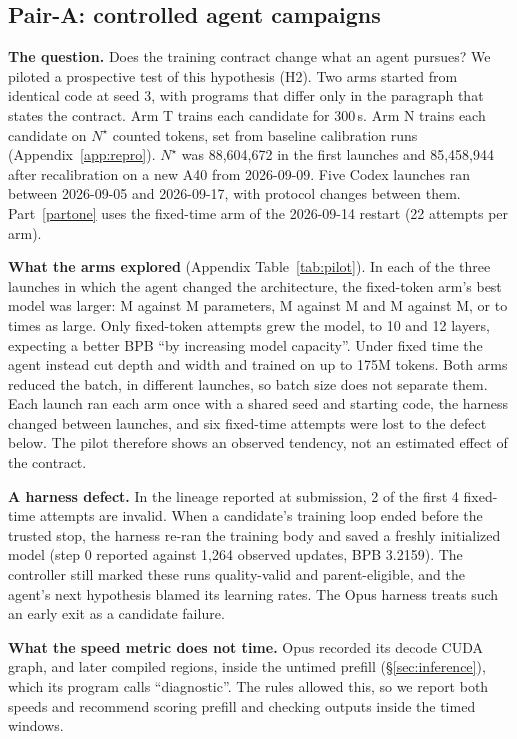 \documentclass{article}
\newif\ifshowhumanmarkers \showhumanmarkersfalse
\newcommand{\humantag}[1]{{\color{humanframe}\sffamily\scriptsize\bfseries HUMAN AUTHOR MUST REWRITE/VERIFY [#1]}\ }
\newcommand{\humanauthor}[2][]{\ifshowhumanmarkers\begin{humanbox}\humantag{#1}#2\end{humanbox}\else #2\par\fi}
\begin{document}
\subsection{Pair-A: controlled agent campaigns}\label{sec:pilot}
\humanauthor[P2-15 r6]{\textbf{The question.} Does the training contract change what an agent pursues? We piloted a prospective test of this hypothesis (H2). Two arms started from identical code at seed 3, with programs that differ only in the paragraph that states the contract. Arm T trains each candidate for 300\,s. Arm N trains each candidate on $N^\star$ counted tokens, set from baseline calibration runs (Appendix~\ref{app:repro}). $N^\star$ was 88,604,672 in the first launches and 85,458,944 after recalibration on a new A40 from 2026-09-09. Five Codex launches ran between 2026-09-05 and 2026-09-17, with protocol changes between them. Part~\ref{partone} uses the fixed-time arm of the 2026-09-14 restart (22 attempts per arm).

\textbf{What the arms explored} (Appendix Table~\ref{tab:pilot}). In each of the three launches in which the agent changed the architecture, the fixed-token arm's best model was larger: \CRFivePilotNA M against \CRFivePilotTA M parameters, \CRFivePilotNB M against \CRFivePilotTB M and \CRFivePilotNC M against \CRFivePilotTC M, or \CRFivePilotRatioLo{} to \CRFivePilotRatioHi{} times as large. Only fixed-token attempts grew the model, to 10 and 12 layers, expecting a better BPB ``by increasing model capacity''. Under fixed time the agent instead cut depth and width and trained on up to 175M tokens. Both arms reduced the batch, in different launches, so batch size does not separate them. Each launch ran each arm once with a shared seed and starting code, the harness changed between launches, and six fixed-time attempts were lost to the defect below. The pilot therefore shows an observed tendency, not an estimated effect of the contract.

\textbf{A harness defect.} In the lineage reported at submission, 2 of the first 4 fixed-time attempts are invalid. When a candidate's training loop ended before the trusted stop, the harness re-ran the training body and saved a freshly initialized model (step 0 reported against 1,264 observed updates, BPB 3.2159). The controller still marked these runs quality-valid and parent-eligible, and the agent's next hypothesis blamed its learning rates. The Opus harness treats such an early exit as a candidate failure.}

\humanauthor[P2-16 r6]{\textbf{What the speed metric does not time.} Opus recorded its decode CUDA graph, and later compiled regions, inside the untimed prefill (\S\ref{sec:inference}), which its program calls ``diagnostic''. The rules allowed this, so we report both speeds and recommend scoring prefill and checking outputs inside the timed windows.}
\label{parttwoend}
\end{document}
